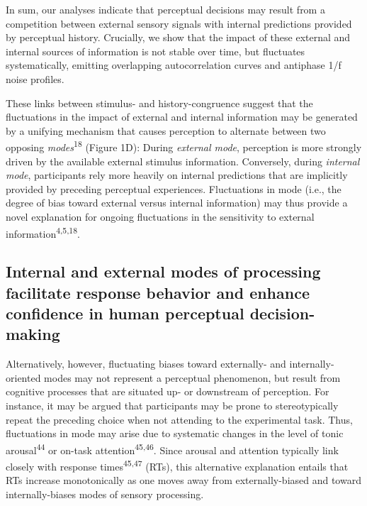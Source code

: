 \documentclass[
]{article}
\begin{document}
In sum, our analyses indicate that perceptual decisions may result from
a competition between external sensory signals with internal predictions
provided by perceptual history. Crucially, we show that the impact of
these external and internal sources of information is not stable over
time, but fluctuates systematically, emitting overlapping
autocorrelation curves and antiphase 1/f noise profiles.

These links between stimulus- and history-congruence suggest that the
fluctuations in the impact of external and internal information may be
generated by a unifying mechanism that causes perception to alternate
between two opposing \emph{modes}\textsuperscript{18} (Figure 1D):
During \emph{external mode}, perception is more strongly driven by the
available external stimulus information. Conversely, during
\emph{internal mode}, participants rely more heavily on internal
predictions that are implicitly provided by preceding perceptual
experiences. Fluctuations in mode (i.e., the degree of bias toward
external versus internal information) may thus provide a novel
explanation for ongoing fluctuations in the sensitivity to external
information\textsuperscript{4,5,18}.

\hypertarget{internal-and-external-modes-of-processing-facilitate-response-behavior-and-enhance-confidence-in-human-perceptual-decision-making}{%
\subsection{Internal and external modes of processing facilitate
response behavior and enhance confidence in human perceptual
decision-making}\label{internal-and-external-modes-of-processing-facilitate-response-behavior-and-enhance-confidence-in-human-perceptual-decision-making}}

Alternatively, however, fluctuating biases toward externally- and
internally-oriented modes may not represent a perceptual phenomenon, but
result from cognitive processes that are situated up- or downstream of
perception. For instance, it may be argued that participants may be
prone to stereotypically repeat the preceding choice when not attending
to the experimental task. Thus, fluctuations in mode may arise due to
systematic changes in the level of tonic arousal\textsuperscript{44} or
on-task attention\textsuperscript{45,46}. Since arousal and attention
typically link closely with response times\textsuperscript{45,47} (RTs),
this alternative explanation entails that RTs increase monotonically as
one moves away from externally-biased and toward internally-biases modes
of sensory processing.
\end{document}
